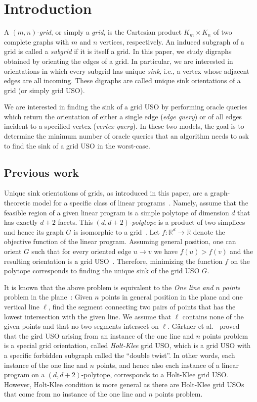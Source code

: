 \documentclass[runningheads,a4paper]{llncs}
\newcommand{\RR}{\ensuremath{\mathbb{R}}}
\begin{document}
\section{Introduction}
A \emph{$(m,n)$-grid}, or simply a \emph{grid}, is the Cartesian product $K_m \times K_n$ of two complete graphs with $m$ and $n$ vertices, respectively. An induced subgraph of a grid is called a \emph{subgrid} if it is itself a grid.
In this paper, we study digraphs obtained by orienting the edges of a grid. 
In particular, we are interested in orientations in which every subgrid has unique \emph{sink}, i.e., a vertex whose adjacent edges are all incoming. 
These digraphs are called unique sink orientations of a grid (or simply grid USO). 

We are interested in finding the sink of a grid USO by performing oracle queries which return the orientation of either a single edge (\emph{edge query}) or of all edges incident to a specified vertex (\emph{vertex query}). 
In these two models, the goal is to determine the minimum number of oracle queries that an algorithm needs to ask to find the sink of a grid USO in the worst-case.

\subsection{Previous work}
Unique sink orientations of grids, as introduced in this paper,
are a graph-theoretic model for a specific class of linear programs~\cite{linepoint}.
Namely, assume that the feasible region of a given linear program is a
simple polytope of dimension $d$ that has exactly $d+2$ facets.
This \emph{$(d, d+2)$-polytope} is a product of two simplices and hence its graph $G$ is isomorphic to a grid~\cite{grid05}. 
Let $f : \RR^d \to \RR$ denote the objective function of the linear program.
Assuming general position, one can orient $G$ such that for every oriented
edge $u \to v$ we have $f(u) > f(v)$ and the resulting orientation is a grid USO~\cite{grid05}.
Therefore, minimizing the function $f$ on the polytope corresponds to finding the
unique sink of the grid USO $G$.

It is known that the above problem is equivalent to the \emph{One line and $n$ points} problem in the plane~\cite{linepoint,welzl2001entering}:
Given $n$ points in general position in the plane and one vertical line $\ell$, find the segment connecting two pairs of points that has the lowest intersection with the given line. 
We assume that $\ell$ contains none of the given points and that no two segments intersect on $\ell$.
G\"artner et al.~\cite{linepoint} proved that the gird USO arising from an instance of the one line and $n$ points problem is a special grid orientation, called \emph{Holt-Klee} grid USO, which is a grid USO with a specific forbidden subgraph called the ``double twist''. In other words, each instance of the one line and $n$ points, and hence also each instance of a linear program on a $(d, d+2)$-polytope, corresponds to a Holt-Klee grid USO. 
However, Holt-Klee condition is more general as there are Holt-Klee grid USOs that come from no instance of the one line and $n$ points problem. 
\end{document}
